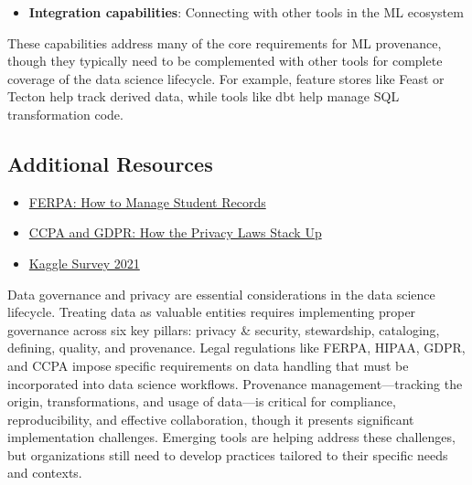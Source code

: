 \documentclass[12pt]{article}
\begin{document}
\begin{enumerate}
\begin{tcolorbox}[colback=blue!5!white,colframe=blue!75!black,title={Solution}]
\begin{itemize}
        \item \textbf{Integration capabilities}: Connecting with other tools in the ML ecosystem
    \end{itemize}
    
    These capabilities address many of the core requirements for ML provenance, though they typically need to be complemented with other tools for complete coverage of the data science lifecycle. For example, feature stores like Feast or Tecton help track derived data, while tools like dbt help manage SQL transformation code.
    \end{tcolorbox}
\end{enumerate}

\subsection{Additional Resources}

\begin{itemize}
    \item \href{https://www.recordnations.com/2019/07/ferpa-how-to-manage-student-records}{FERPA: How to Manage Student Records}
    \item \href{https://riskonnect.com/uk/regulatory-compliance/ccpa-and-gdpr-how-the-privacy-laws-stack-up/}{CCPA and GDPR: How the Privacy Laws Stack Up}
    \item \href{https://www.kaggle.com/kaggle-survey-2021}{Kaggle Survey 2021}
\end{itemize}

\begin{tcolorbox}[colback=red!5!white,colframe=red!75!black,title={Key Takeaway}]
Data governance and privacy are essential considerations in the data science lifecycle. Treating data as valuable entities requires implementing proper governance across six key pillars: privacy \& security, stewardship, cataloging, defining, quality, and provenance. Legal regulations like FERPA, HIPAA, GDPR, and CCPA impose specific requirements on data handling that must be incorporated into data science workflows. Provenance management—tracking the origin, transformations, and usage of data—is critical for compliance, reproducibility, and effective collaboration, though it presents significant implementation challenges. Emerging tools are helping address these challenges, but organizations still need to develop practices tailored to their specific needs and contexts.
\end{tcolorbox}
\end{document}
